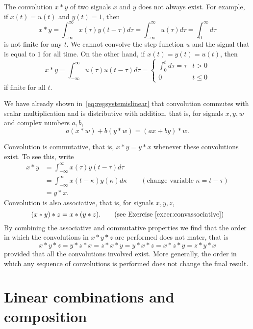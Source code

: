 The convolution $x * y$ of two signals $x$ and $y$ does not always exist.  For example, if $x(t) = u(t)$ and $y(t) = 1$, then
\[
x * y = \int_{-\infty}^\infty x(\tau) y(t - \tau) d\tau = \int_{-\infty}^\infty u(\tau) d\tau = \int_{0}^\infty d\tau
\]
is not finite for any $t$.  We cannot convolve the step function $u$ and the signal that is equal to $1$ for all time.  On the other hand, if $x(t) = y(t) = u(t)$, then
\[
x * y = \int_{-\infty}^\infty u(\tau) u(t - \tau) d\tau =  \begin{cases}
\int_{0}^t d\tau  = \tau & t > 0 \\
0 & t \leq 0
\end{cases}
\]
if finite for all $t$.  %

We have already shown in~\eqref{eq:regsystemislinear} that convolution commutes with scalar multiplication and is distributive with addition, that is, for signals $x,y,w$ and complex numbers $a,b$,
\[
a (x * w) + b (y * w) = (ax + by) * w.
\]

Convolution is commutative, that is, $x*y = y*x$ whenever these convolutions exist.  To see this, write
\begin{align*}
x*y &= \int_{-\infty}^\infty x(\tau) y(t - \tau) d\tau \\
&= \int_{-\infty}^\infty x(t - \kappa) y(\kappa) d\kappa \qquad (\text{change variable $\kappa = t - \tau$}) \\
&= y * x.
\end{align*}
Convolution is also associative, that is, for signals $x,y,z$, 
\[
(x*y)*z = x*(y*z). \qquad \text{(see Exercise~\ref{excer:convassociative})}
\]
By combining the associative and commutative properties we find that the order in which the convolutions in $x * y * z$ are performed does not mater, that is
\[
x*y*z = y*z*x = z*x*y = y*x*z = x*z*y = z*y*x
\]
provided that all the convolutions involved exist.  More generally, the order in which any sequence of convolutions is performed does not change the final result.

\section{Linear combinations and composition}\label{sec:line-comb-comp}

